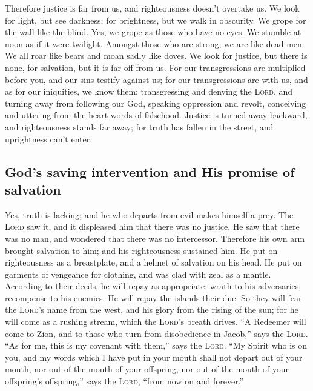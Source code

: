  Therefore justice is far from us, and righteousness
doesn't overtake us. We look for light, but see darkness; for
brightness, but we walk in obscurity.  We grope for the
wall like the blind. Yes, we grope as those who have no eyes. We stumble
at noon as if it were twilight. Amongst those who are strong, we are
like dead men.  We all roar like bears and moan sadly
like doves. We look for justice, but there is none, for salvation, but
it is far off from us.  For our transgressions are
multiplied before you, and our sins testify against us; for our
transgressions are with us, and as for our iniquities, we know them:
 transgressing and denying the \textsc{Lord}, and turning
away from following our God, speaking oppression and revolt, conceiving
and uttering from the heart words of falsehood.  Justice
is turned away backward, and righteousness stands far away; for truth
has fallen in the street, and uprightness can't enter.

\hypertarget{gods-saving-intervention-and-his-promise-of-salvation}{%
\subsection{God's saving intervention and His promise of
salvation}\label{gods-saving-intervention-and-his-promise-of-salvation}}

 Yes, truth is lacking; and he who departs from evil
makes himself a prey. The \textsc{Lord} saw it, and it displeased him
that there was no justice.  He saw that there was no man,
and wondered that there was no intercessor. Therefore his own arm
brought salvation to him; and his righteousness sustained him.
 He put on righteousness as a breastplate, and a helmet
of salvation on his head. He put on garments of vengeance for clothing,
and was clad with zeal as a mantle.  According to their
deeds, he will repay as appropriate: wrath to his adversaries,
recompense to his enemies. He will repay the islands their due.
 So they will fear the \textsc{Lord}'s name from the
west, and his glory from the rising of the sun; for he will come as a
rushing stream, which the \textsc{Lord}'s breath drives. 
``A Redeemer will come to Zion, and to those who turn from disobedience
in Jacob,'' says the \textsc{Lord}.  ``As for me, this is
my covenant with them,'' says the \textsc{Lord}. ``My Spirit who is on
you, and my words which I have put in your mouth shall not depart out of
your mouth, nor out of the mouth of your offspring, nor out of the mouth
of your offspring's offspring,'' says the \textsc{Lord}, ``from now on
and forever.''

